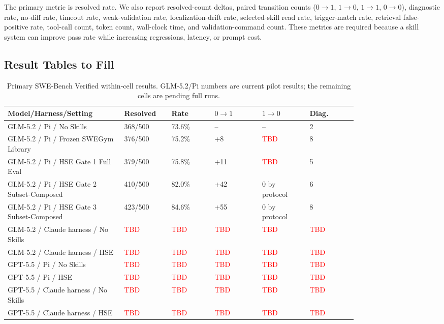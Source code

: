 \documentclass{article}
\newcommand{\method}{HSE}
\newcommand{\tbd}{\textcolor{red}{TBD}}
\begin{document}
The primary metric is resolved rate. We also report resolved-count deltas,
paired transition counts ($0{\rightarrow}1$, $1{\rightarrow}0$,
$1{\rightarrow}1$, $0{\rightarrow}0$), diagnostic rate, no-diff rate, timeout
rate, weak-validation rate, localization-drift rate, selected-skill read rate,
trigger-match rate, retrieval false-positive rate, tool-call count, token count,
wall-clock time, and validation-command count. These metrics are required
because a skill system can improve pass rate while increasing regressions,
latency, or prompt cost.

\subsection{Result Tables to Fill}

\begin{table}[h]
\caption{Primary SWE-Bench Verified within-cell results. GLM-5.2/Pi
numbers are current pilot results; the remaining cells are pending full runs.}
\label{tab:main-results}
\begin{center}
\begin{tabular}{L{0.27\linewidth} C{0.10\linewidth} C{0.10\linewidth} C{0.11\linewidth} C{0.11\linewidth} C{0.11\linewidth}}
\toprule
Model/Harness/Setting & Resolved & Rate & $0{\rightarrow}1$ & $1{\rightarrow}0$ & Diag. \\
\midrule
GLM-5.2 / Pi / No Skills & 368/500 & 73.6\% & -- & -- & 2 \\
GLM-5.2 / Pi / Frozen SWEGym Library & 376/500 & 75.2\% & +8 & \tbd & 8 \\
GLM-5.2 / Pi / \method{} Gate 1 Full Eval & 379/500 & 75.8\% & +11 & \tbd & 5 \\
GLM-5.2 / Pi / \method{} Gate 2 Subset-Composed & 410/500 & 82.0\% & +42 & 0 by protocol & 6 \\
GLM-5.2 / Pi / \method{} Gate 3 Subset-Composed & 423/500 & 84.6\% & +55 & 0 by protocol & 8 \\
GLM-5.2 / Claude harness / No Skills & \tbd & \tbd & \tbd & \tbd & \tbd \\
GLM-5.2 / Claude harness / \method{} & \tbd & \tbd & \tbd & \tbd & \tbd \\
GPT-5.5 / Pi / No Skills & \tbd & \tbd & \tbd & \tbd & \tbd \\
GPT-5.5 / Pi / \method{} & \tbd & \tbd & \tbd & \tbd & \tbd \\
GPT-5.5 / Claude harness / No Skills & \tbd & \tbd & \tbd & \tbd & \tbd \\
GPT-5.5 / Claude harness / \method{} & \tbd & \tbd & \tbd & \tbd & \tbd \\
\bottomrule
\end{tabular}
\end{center}
\end{table}
\end{document}
